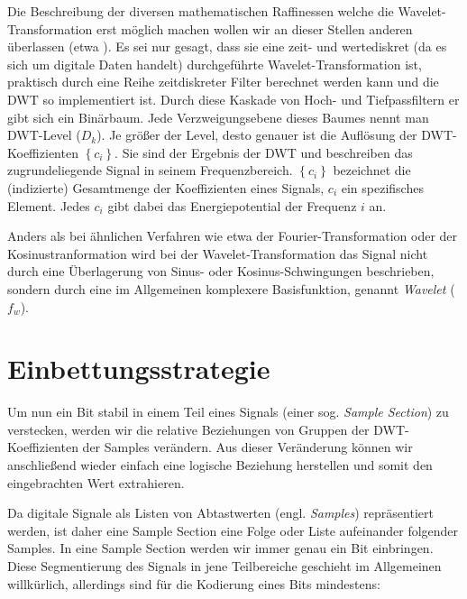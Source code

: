 Die Beschreibung der diversen mathematischen Raffinessen welche die Wavelet\--Trans\-formation erst m\"oglich machen wollen wir an dieser Stellen anderen \"uberlassen (etwa \cite{polikar1996engineer}). Es sei nur gesagt, dass sie eine zeit- und wertediskret (da es sich um digitale Daten handelt) durchgef\"uhrte Wavelet-\-Trans\-formation ist, praktisch durch eine Reihe zeitdiskreter Filter berechnet werden kann und die DWT so implementiert ist. Durch diese Kaskade von Hoch- und Tiefpassfiltern er gibt sich ein Binärbaum. Jede Verzweigungsebene dieses Baumes nennt man DWT-Level (${D}_{k}$). Je größer der Level, desto genauer ist die Auflösung der DWT-Koeffizienten $\left\{{c}_{i}\right\}$. Sie sind der Ergebnis der DWT und beschreiben das zugrundeliegende Signal in seinem Frequenzbereich. $\left\{{c}_{i}\right\}$ bezeichnet die (indizierte) Gesamtmenge der Koeffizienten eines Signals, $c_i$ ein spezifisches Element. Jedes $c_i$ gibt dabei das Energiepotential der Frequenz $i$ an. 

Anders als bei \"ahnlichen Verfahren wie etwa der Fourier-\-Transformation oder der Kosinus\-tranformation wird bei der Wavelet-Transformation das Signal nicht durch eine Überlagerung von Sinus- oder Kosinus-Schwingungen beschrieben, sondern durch eine im Allgemeinen komplexere Basisfunktion, genannt \textit{Wavelet} (${f}_{w}$).


\section{Einbettungsstrategie}
\label{sec:embeddingstragety}

Um nun ein Bit stabil in einem Teil eines Signals (einer sog. \textit{Sample Section}) zu verstecken, werden wir die relative Beziehungen von Gruppen der DWT-Koeffizienten der Samples verändern. Aus dieser Veränderung können wir anschließend wieder einfach eine logische Beziehung herstellen und somit den eingebrachten Wert extrahieren. 

Da digitale Signale als Listen von Abtastwerten (engl. \textit{Samples}) repräsentiert werden, ist daher eine Sample Section eine Folge oder Liste aufeinander folgender Samples. In eine Sample Section werden wir immer genau ein Bit einbringen. Diese Segmentierung des Signals in jene Teilbereiche geschieht im Allgemeinen willkürlich, allerdings sind für die Kodierung eines Bits mindestens:

